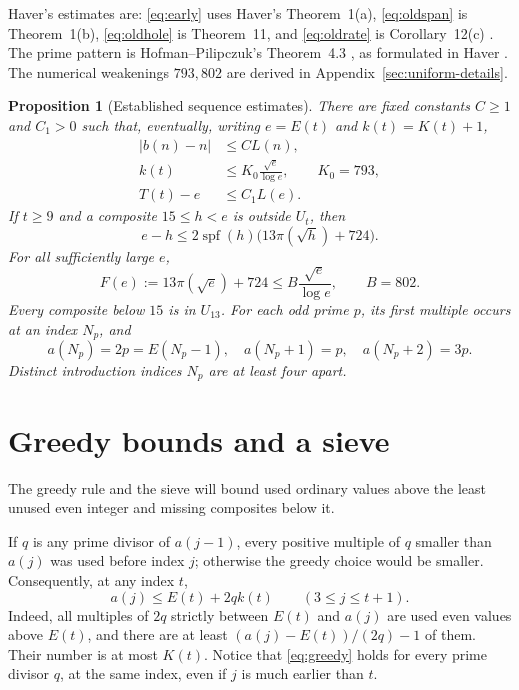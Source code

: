 \documentclass[11pt]{article}
\newtheorem{proposition}[theorem]{Proposition}
\theoremstyle{remark}
\newcommand{\U}{U}
\newcommand{\spf}{\operatorname{spf}}
\begin{document}
Haver's estimates are: \eqref{eq:early}
uses Haver's Theorem~1(a), \eqref{eq:oldspan} is Theorem~1(b),
\eqref{eq:oldhole} is Theorem~11, and
\eqref{eq:oldrate} is Corollary~12(c) \cite{haver}.
The prime pattern is Hofman--Pilipczuk's Theorem~4.3 \cite{hp}, as formulated
in Haver \cite[Section~2, (F2)]{haver}.
The numerical weakenings $793,802$ are derived in
Appendix~\ref{sec:uniform-details}.
\begin{proposition}[Established sequence estimates]\label{prop:inputs}
There are fixed constants $C\geq1$ and $C_1>0$ such that, eventually,
writing $e=E(t)$ and $k(t)=K(t)+1$,
\begin{align}
 |b(n)-n|&\leq C L(n),\label{eq:oldrate}\\
 k(t)&\leq K_0\frac{\sqrt e}{\log e},\qquad K_0=793,\label{eq:early}\\
 T(t)-e&\leq C_1 L(e).\label{eq:oldspan}
\end{align}
If $t\geq9$ and a composite $15\leq h<e$ is outside $\U_t$, then
\begin{equation}\label{eq:oldhole}
 e-h\leq2\spf(h)\bigl(13\pi(\sqrt h)+724\bigr).
\end{equation}
For all sufficiently large $e$,
\begin{equation}\label{eq:F}
 F(e):=13\pi(\sqrt e)+724\leq B\frac{\sqrt e}{\log e},
 \qquad B=802.
\end{equation}
Every composite below $15$ is in $\U_{13}$.
For each odd prime $p$, its first multiple occurs at an index $N_p$,
and
\begin{equation}\label{eq:block}
 a(N_p)=2p=E(N_p-1),\quad a(N_p+1)=p,\quad a(N_p+2)=3p.
\end{equation}
Distinct introduction indices $N_p$ are at least four apart.
\end{proposition}

\section{Greedy bounds and a sieve}\label{sec:elementary}
The greedy rule and the sieve will bound used ordinary values above
the least unused even integer and missing composites below it.

If $q$ is any prime divisor of $a(j-1)$, every positive multiple of $q$
smaller than $a(j)$ was used before index $j$; otherwise the greedy
choice would be smaller. Consequently, at any index $t$,
\begin{equation}\label{eq:greedy}
 a(j)\leq E(t)+2qk(t)\qquad(3\leq j\leq t+1).
\end{equation}
Indeed, all multiples of $2q$ strictly between $E(t)$ and $a(j)$
are used even values above $E(t)$, and there are at least
$(a(j)-E(t))/(2q)-1$ of them. Their number is at most $K(t)$.
Notice that \eqref{eq:greedy} holds for every prime divisor $q$,
at the same index, even if $j$ is much earlier than $t$.
\end{document}
